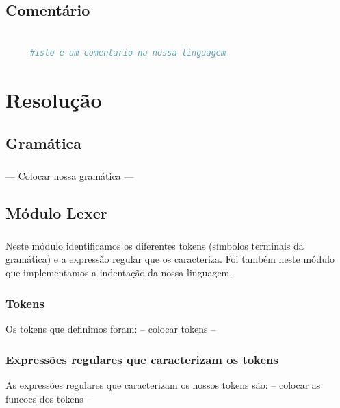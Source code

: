 \documentclass[11pt,a4paper]{report}
\begin{document}
    \section{Comentário}
    \begin{lstlisting}[language=Python]

     #isto e um comentario na nossa linguagem
     \end{lstlisting}
     

    \chapter{Resolução}
    \section{Gramática}
    \paragraph{}
    --- Colocar nossa gramática ---


    \section{Módulo Lexer}
    \paragraph{}
    Neste módulo identificamos os diferentes tokens (símbolos terminais da gramática) e a expressão regular que os caracteriza. Foi também neste módulo que implementamos a indentação da nossa linguagem.

    \paragraph{}
    \subsection{Tokens}
       Os tokens que definimos foram:
          -- colocar tokens --
      
    \paragraph{}
    \subsection{Expressões regulares que caracterizam os tokens}
    As expressões regulares que caracterizam os nossos tokens são:
     -- colocar as funcoes dos tokens --
\end{document}
